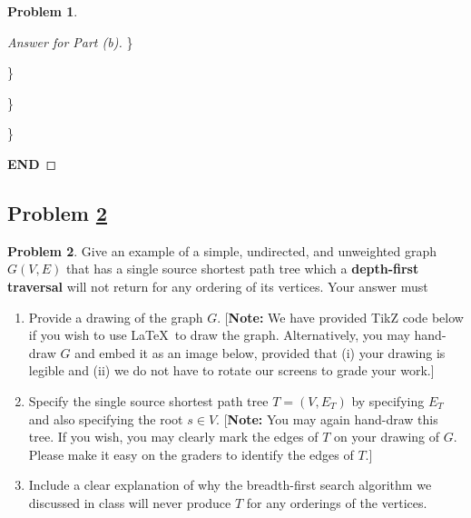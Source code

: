 \documentclass[11pt]{article}
\theoremstyle{definition}
\theoremstyle{definition}
\newtheorem{required}{Problem}
\theoremstyle{definition}
\begin{document}
\begin{required}
\begin{enumerate}[label=(\alph*)]
\begin{proof}[Answer for Part (b)]
\item	\hspace*{30mm} \}
\item	\hspace*{20mm} \}
\item	\hspace*{10mm} \}
\item	\hspace*{0mm} \}
\item \textbf{END}
\end{proof}
\end{enumerate}
\end{required}






\newpage
\subsection{Problem \ref{DFS2}} 
\begin{required} \label{DFS2}
Give an example of a simple, undirected, and unweighted graph $G(V, E)$ that has a single source shortest path tree which a \textbf{depth-first traversal} will not return for any ordering of its vertices. 
    Your answer must
    \begin{enumerate}[label=(\alph*)]
    	\item Provide a drawing of the graph $G$. [\textbf{Note:} We have provided TikZ code below if you wish to use \LaTeX \ to draw the graph. Alternatively, you may hand-draw $G$ and embed it as an image below, provided that (i) your drawing is legible and (ii) we do not have to rotate our screens to grade your work.]
    	\item Specify the single source shortest path tree $T = (V,E_T)$ by specifying $E_T$ and also specifying the root $s \in V$. [\textbf{Note:} You may again hand-draw this tree. If you wish, you may clearly mark the edges of $T$ on your drawing of $G$. Please make it easy on the graders to identify the edges of $T$.] 
    	\item Include a clear explanation of why the breadth-first search algorithm we discussed in class will never produce $T$ for any orderings of the vertices.
    \end{enumerate}

\end{required}
\end{document}
